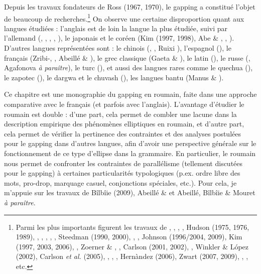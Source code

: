 Depuis les travaux fondateurs de Ross (1967, 1970), le gapping a constitué l'objet de beaucoup de recherches.\footnote{Parmi les plus importants figurent les travaux de \citet{Koutsoudas1970}, \citet{Jackendoff1971}, \citet{Maling1972}, \citet{Hankamer1973}, Hudson (1975, 1976, 1989), \citet{Kuno1976}, \citet{Neijt1979}, \citet{Siegel1984}, \citet{Oehrle1987}, \citet{Jayaseelan1990}, Steedman (1990, 2000), \citet{Gardent1991}, \citet{Kehler1994}, Johnson (1996/2004, 2009), Kim (1997, 2003, 2006), \citet{Hartmann2000}, Zoerner \& \citet{Agbayani2000}, \citet{Coppock2001}, Carlson (2001, 2002), \citet{Lin2002}, Winkler \& López (2002), Carlson \textit{et al.} (2005), \citet{Chaves2005}, \citet{Winkler2005}, \citet{Reich2006}, Hernàndez (2006), Zwart (2007, 2009), \citet{Hoyt2008}, \citet{Vicente2010}, etc.} On observe une certaine disproportion quant aux langues étudiées : l'anglais est de loin la langue la plus étudiée, suivi par l'allemand (\citet{Hartmann2000}, \citet{Winkler2005}, \citet{Osborne2006}, \citet{Reich2006}, \citet{Repp2009}), le japonais et le coréen (Kim (1997, 1998), Abe \& \citet{Hoshi1999}, \citet{Lee2005}, \citet{Yosuke2009}). D'autres langues représentées sont : le chinois (\citet{Paul1999}, \citet{Tang2001}, Ruixi \citet{Ressy2008}), l'espagnol (\citet{Tran1999}), le français (Zribi-\citet{Hertz1986}, \citet{Tassin1998}, Abeillé \& \citet{Mouret2010}), le grec classique (Gaeta \& \citet{Luraghi2001}), le latin (\citet{Panhuis1979}), le russe (\citet{Kazenin2001}, Agafonova \textit{à paraître}), le turc (\citet{Ince2009}), et aussi des langues rares comme le quechua (\citet{Pulte1971}), le zapotec (\citet{Rosenbaum1977}), le dargwa et le chuvash (\citet{Kazenin2001}), les langues bantu (Manus \& \citet{Patin2011}). 

Ce chapitre est une monographie du gapping en roumain, faite dans une approche comparative avec le français (et parfois avec l'anglais). L'avantage d'étudier le roumain est double : d'une part, cela permet de combler une lacune dans la description empirique des phénomènes elliptiques en roumain, et d'autre part, cela permet de vérifier la pertinence des contraintes et des analyses postulées pour le gapping dans d'autres langues, afin d'avoir une perspective générale sur le fonctionnement de ce type d'ellipse dans la grammaire. En particulier, le roumain nous permet de confronter les contraintes de parallélisme (tellement discutées pour le gapping) à certaines particularités typologiques (p.ex. ordre libre des mots, pro-drop, marquage casuel, conjonctions spéciales, etc.). Pour cela, je m'appuie sur les travaux de Bîlbîie (2009), Abeillé \& \citet{Mouret2010} et Abeillé, Bîlbîie \& Mouret \textit{à paraître}.

